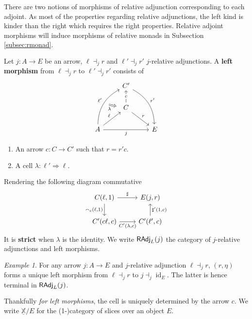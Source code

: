 \documentclass[10pt,a4paper]{article}
\newcommand{\bb}[1]{\mathbb{#1}}
\newcommand{\cat}[1]{\textcat{#1}}
\newcommand{\textcat}[1]{{\normalfont\textsf{#1}}}
\newcommand{\To}{\Rightarrow}
\DeclareMathOperator{\id}{id}
\theoremstyle{plain}
\theoremstyle{definition}
\theoremstyle{remark}
\newtheorem{example}[theorem]{Example}
\begin{document}
There are two notions of morphisms of relative adjunction corresponding to each adjoint. As most of the properties regarding relative adjunctions, the left kind is kinder than the right which requires the right properties. Relative adjoint morphisms will induce morphisms of relative monads in Subsection \ref{subsec:rmonad}.

\begin{definition}
    Let $j : A \to E$ be an arrow, $\ell\dashv_j r$ and $\ell'\dashv_jr'$ $j$-relative adjunctions. A \textbf{left morphism} from $\ell\dashv_jr$ to $\ell'\dashv_j r'$ consists of
    \[\begin{tikzcd}
        &C'\ar[ddr, "r'", bend left]&\\
        &\ar[u, "c"{description}] C \ar[dr, "r"]\\
        A \ar[uur, bend left, "\ell'", ""{anchor=center,name=a}] \ar[ur, "\ell"] \ar[rr, "j"'] && E
        \ar[from=a, to=2-2, Rightarrow, "\lambda"', shorten=2mm]
    \end{tikzcd}\]
    \begin{enumerate}
        \item An arrow $c : C \to C'$ such that $r = r'c$.
        \item A cell $\lambda : \ell'\To \ell$.
    \end{enumerate}
    Rendering the following diagram commutative
    \[\begin{tikzcd}
        \ar[d, "{\smallfrown_c(\ell, 1)}"'] C(\ell, 1) \ar[r, "\sharp"] & E(j, r)\\
        C'(c\ell, c) \ar[r, "{C'(\lambda, c)}"'] & C'(\ell', c)\ar[u, "{\sharp'(1, c)}"']
    \end{tikzcd}\]
    It is \textbf{strict} when $\lambda$ is the identity. We write $\cat{RAdj}_L(j)$ the category of $j$-relative adjunctions and left morphisms.
\end{definition}

\begin{example}
    For any arrow $j : A \to E$ and $j$-relative adjunction $\ell\dashv_j r$, $(r, \eta)$ forms a unique left morphism from $\ell\dashv_j r$ to $j\dashv_j \id_E$. The latter is hence terminal in $\cat{RAdj}_L(j)$.
\end{example}

Thankfully \textit{for left morphisms}, the cell is uniquely determined by the arrow $c$. We write $\underline{\bb X}/E$ for the (1-)category of slices over an object $E$.
\end{document}
